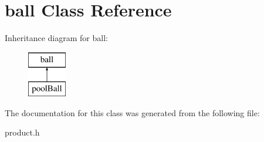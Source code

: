 \hypertarget{classball}{}\section{ball Class Reference}
\label{classball}
Inheritance diagram for ball\+:\begin{figure}[H]
\begin{center}
\leavevmode
\includegraphics[height=2.000000cm]{classball}
\end{center}
\end{figure}


The documentation for this class was generated from the following file\+:\begin{DoxyCompactItemize}
\item 
product.\+h\end{DoxyCompactItemize}
